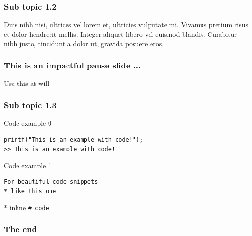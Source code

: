 \documentclass[aspectratio=169]{beamer}
\begin{document}
\begin{frame}
\frametitle{Sub topic 1.2}

Duis nibh nisi, ultrices vel lorem et, ultricies vulputate mi. 
Vivamus pretium risus et dolor hendrerit mollis. 
Integer aliquet libero vel euismod blandit. 
Curabitur nibh justo, tincidunt a dolor ut, gravida posuere eros. 

\end{frame}

\begin{frame}
\frametitle{This is an impactful pause slide ...}

Use this at will
\end{frame}

\begin{frame}[fragile]
\frametitle{Sub topic 1.3}

Code example 0

\begin{lstlisting}
printf("This is an example with code!");
>> This is an example with code!
\end{lstlisting}

Code example 1
\begin{verbatim}
For beautiful code snippets
* like this one
\end{verbatim}

* inline \tt{\# code}
\end{frame}

\begin{frame}
\frametitle{The end}
\end{frame}

\subtitle{Thank you}
\frame[plain]{\titlepage}
\end{document}
